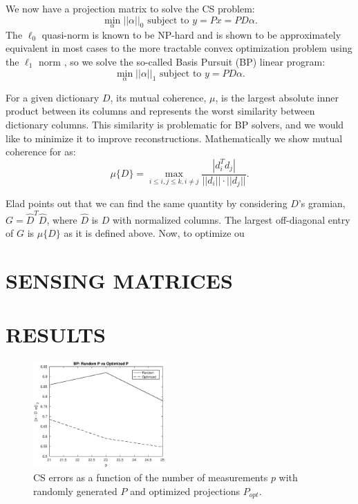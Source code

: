\documentclass[journal]{IEEEtran}
\begin{document}
We now have a projection matrix to solve the CS problem: $$ \min_\alpha ||\alpha||_0 \mbox{ subject to } y = Px = PD\alpha.$$  The $\ell_0$ quasi-norm is known to be NP-hard and is shown to be approximately equivalent in most cases to the more tractable convex optimization problem using the $\ell_1$ norm \cite{convexoptimization}, so we solve the so-called Basis Pursuit (BP) linear program: $$ \min_\alpha ||\alpha||_1 \mbox{ subject to } y = PD\alpha .$$

For a given dictionary $D$, its mutual coherence, $\mu$, is the largest absolute inner product between its columns and represents the worst similarity between dictionary columns.  This similarity is problematic for BP solvers, and we would like to minimize it to improve reconstructions.  Mathematically we show mutual coherence for  as: $$ \mu\{D\} = \max_{i \leq i,j \leq k, i \neq j} \frac{| d_i^Td_j |}{|| d_i || \cdot || d_j ||}. $$

Elad points out that we can find the same quantity by considering $D$'s gramian, $G = \hat{D}^T \hat{D}$, where $\hat{D}$ is $D$ with normalized columns.  The largest off-diagonal entry of $G$ is $\mu\{D\}$ as it is defined above.  Now, to optimize ou

\section{SENSING MATRICES}



\section{RESULTS}

\begin{figure}[]
  \centering
  \includegraphics[width=0.45\textwidth]{rel_errors.eps}
  \caption{CS errors as a function of the number of measurements $p$ with randomly generated $P$ and optimized projections $P_{opt}$.}
  \label{fig:intuitive}
\end{figure}
\end{document}

